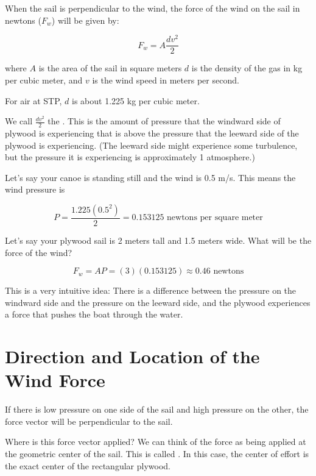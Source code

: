 \begin{mdframed}[style=important, frametitle={Wind Force}]

When the sail is perpendicular to the wind,  the force of the wind on the sail in newtons ($F_w$) will be given by:

$$F_w = A \frac{d v^2}{2}$$

where $A$ is the area of the sail in square meters  $d$ is the density of the gas in kg per cubic meter, and $v$ is the wind speed in meters per second.

For air at STP,  $d$ is about 1.225 kg per cubic meter.

We call $\frac{d v^2}{2}$  the .  This is the amount of pressure that the windward side of plywood is experiencing that is above the 
 pressure that the leeward side of the plywood is experiencing.  (The leeward side might experience some turbulence,  but the pressure it is experiencing is 
 approximately 1 atmosphere.)

\end{mdframed}

Let's say your canoe is standing still and the wind is 0.5 m/s.  This means the wind pressure is

$$P =  \frac{1.225 (0.5^2)}{2} =  0.153125 \text{ newtons per square meter}$$

Let's say your plywood sail is 2 meters tall and 1.5 meters wide.  What will be the force of the wind?

$$F_w  = A P = (3)(0.153125) \approx 0.46 \text{ newtons}$$

This is a very intuitive idea: There is a difference between the pressure on the windward side and the pressure on the leeward side, and the plywood experiences a force that pushes
the boat through the water.


\section{Direction and Location of the Wind Force}

If there is low pressure on one side of the sail and high pressure on the other,  the force vector will be perpendicular to the sail. 
 
Where is this force vector applied?  We can think of the force as being applied at the geometric center of the sail.  This is called . In this case,  the center of effort is the exact center of the rectangular plywood.

